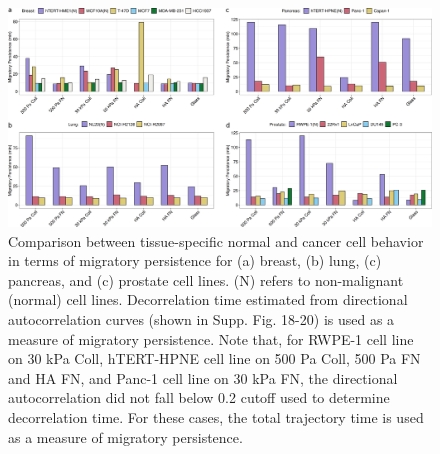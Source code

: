 \documentclass[11pt,letterpaper,english,oneside]{article} %
\begin{document}
\begin{figure}[H]
    \hspace*{-0.8cm}
    \centering
    \includegraphics{../Figures/Supplementary_Figure15/supplementary_figure15.png}
    \caption{Comparison between tissue-specific normal and cancer cell behavior in terms of migratory persistence for (a) breast, (b) lung, (c) pancreas, and (c) prostate cell lines.
    (N) refers to non-malignant (normal) cell lines. 
    Decorrelation time estimated from directional autocorrelation curves (shown in Supp. Fig. 18-20) is used as a measure of migratory persistence.
    Note that, for RWPE-1 cell line on 30 kPa Coll, hTERT-HPNE cell line on 500 Pa Coll, 500 Pa FN and HA FN, and Panc-1 cell line on 30 kPa FN,
    the directional autocorrelation did not fall below 0.2 cutoff used to determine decorrelation time.
    For these cases, the total trajectory time is used as a measure of migratory persistence.}
    \label{fig:fig15}
\end{figure}
\end{document}
